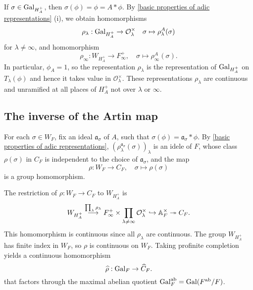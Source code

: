 \documentclass{article}
\renewcommand{\O}{\mathcal{O}}
\newcommand{\ab}{\mathrm{ab}}
\begin{document}
If $\sigma\in\operatorname{Gal}_{H_A^+}$,
then $\sigma(\phi) = \phi = A * \phi$.
By \cref{basic properties of adic representations} (i),
we obtain homomorphisms
\[\rho_\lambda : \gal_{H_A^+}\to \O_\lambda^\times\quad \sigma\mapsto \rho_\lambda^A(\sigma)\]
for $\lambda\ne\infty$, and homomorphism
\[\rho_\infty : W_{H_A^+}\to F_\infty^+,\quad \sigma\mapsto \rho_\infty^A(\sigma).\]
In particular, $\phi_A = 1$, so the representation $\rho_\lambda$ is the representation of $\operatorname{Gal}_{H_A^+}$ on $T_\lambda(\phi)$ and hence it takes value in $\O_\lambda^\times$.
These representations $\rho_\lambda$ are continuous and unramified at all places of $H_A^+$ not over $\lambda$ or $\infty$.



\subsection{The inverse of the Artin map}
For each $\sigma\in W_F$,
fix an ideal $\mathfrak{a}_\sigma$ of $A$,
such that $\sigma(\phi) = \mathfrak{a}_\sigma * \phi$.
By \cref{basic properties of adic representations}, $\left( \rho_\lambda^{\mathfrak{a}_\sigma}(\sigma) \right)_\lambda$ is an idele of $F$, whose class $\rho(\sigma)$ in $C_F$ is independent to the choice of $\mathfrak{a}_\sigma$,
and the map \[\rho : W_F\to C_F,\quad \sigma\mapsto\rho(\sigma)\]
is a group homomorphism.

The restriction of $\rho : W_F\to C_F$ to $W_{H_A^+}$ is
\[W_{H_A^+}\stackrel{\prod_{\lambda}\rho_\lambda}{\longrightarrow} F_\infty^+\times \prod_{\lambda\ne\infty} \O_\lambda^\times\hookrightarrow\A_F^\times\surject C_F.\]
This homomorphism is continuous since all $\rho_\lambda$ are continuous.
The group $W_{H_A^+}$ has finite index in $W_F$,
so $\rho$ is continuous on $W_F$.
Taking profinite completion yields a continuous homomorphism
\[\widehat\rho : \operatorname{Gal}_F\to \widehat C_F.\]
that factors through the maximal abelian quotient $\gal_F^\ab = \gal(F^\ab/F)$.
\end{document}
